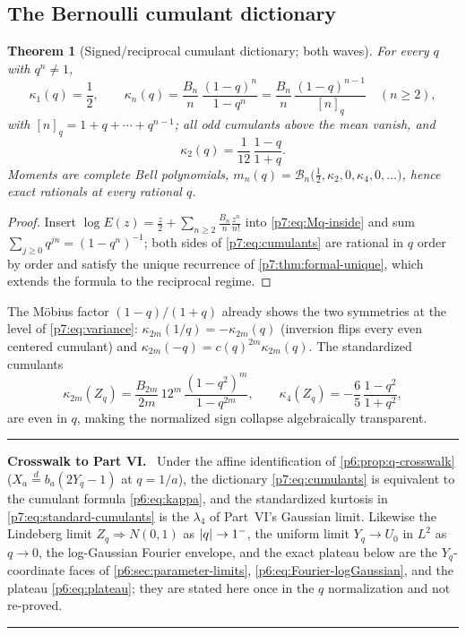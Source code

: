 \documentclass[11pt,oneside]{article}
\numberwithin{equation}{section}
\newtheorem{theorem}{Theorem}[section]
\theoremstyle{definition}
\theoremstyle{remark}
\newcommand{\Bell}{\mathcal B}
\newenvironment{statusbox}[1]{%
  \par\medskip\noindent\begin{center}\begin{minipage}{0.94\textwidth}%
  \color{linkblue}\hrule\vspace{0.65em}%
  \color{black}\textbf{\color{linkblue}#1.}\ }{%
  \par\vspace{0.65em}\color{linkblue}\hrule
  \end{minipage}\end{center}\medskip}
\begin{document}
\subsection{The Bernoulli cumulant dictionary}

\begin{theorem}[Signed/reciprocal cumulant dictionary; both waves]
\label{p7:thm:cumulants}
For every $q$ with $q^n\ne1$,
\begin{equation}\label{p7:eq:cumulants}
 \boxed{\ \kappa_1(q)=\frac12,
 \qquad
 \kappa_n(q)=\frac{B_n}{n}\,\frac{(1-q)^n}{1-q^n}
 =\frac{B_n}{n}\,\frac{(1-q)^{n-1}}{[n]_q}
 \quad(n\ge2),\ }
\end{equation}
with $[n]_q=1+q+\cdots+q^{n-1}$; all odd cumulants above the mean vanish, and
\begin{equation}\label{p7:eq:variance}
 \kappa_2(q)=\frac1{12}\,\frac{1-q}{1+q}.
\end{equation}
Moments are complete Bell polynomials,
$m_n(q)=\Bell_n\bigl(\tfrac12,\kappa_2,0,\kappa_4,0,\ldots\bigr)$, hence exact
rationals at every rational $q$.
\end{theorem}

\begin{proof}
Insert $\log E(z)=\tfrac z2+\sum_{n\ge2}\tfrac{B_n}{n}\tfrac{z^n}{n!}$ into
\eqref{p7:eq:Mq-inside} and sum $\sum_{j\ge0}q^{jn}=(1-q^n)^{-1}$; both sides
of \eqref{p7:eq:cumulants} are rational in $q$ order by order and satisfy the
unique recurrence of \cref{p7:thm:formal-unique}, which extends the formula to
the reciprocal regime.
\end{proof}

The M\"obius factor $(1-q)/(1+q)$ already shows the two symmetries at the
level of \eqref{p7:eq:variance}: $\kappa_{2m}(1/q)=-\kappa_{2m}(q)$ (inversion
flips every even centered cumulant) and
$\kappa_{2m}(-q)=c(q)^{2m}\kappa_{2m}(q)$.  The standardized cumulants
\begin{equation}\label{p7:eq:standard-cumulants}
 \kappa_{2m}(Z_q)=\frac{B_{2m}}{2m}\,12^m\,
 \frac{(1-q^2)^m}{1-q^{2m}},
 \qquad
 \kappa_4(Z_q)=-\frac65\,\frac{1-q^2}{1+q^2},
\end{equation}
are even in $q$, making the normalized sign collapse algebraically
transparent.

\begin{statusbox}{Crosswalk to Part VI}
Under the affine identification of \cref{p6:prop:q-crosswalk}
($X_a\overset d=b_a(2Y_q-1)$ at $q=1/a$), the dictionary
\eqref{p7:eq:cumulants} is equivalent to the cumulant formula
\eqref{p6:eq:kappa}, and the standardized kurtosis in
\eqref{p7:eq:standard-cumulants} is the $\lambda_4$ of Part~VI's Gaussian
limit.  Likewise the Lindeberg limit $Z_q\Rightarrow N(0,1)$ as
$\left\lvert q\right\rvert\to1^-$, the uniform limit $Y_q\to U_0$ in $L^2$ as $q\to0$, the
log-Gaussian Fourier envelope, and the exact plateau below are the
$Y_q$-coordinate faces of \cref{p6:sec:parameter-limits},
\cref{p6:eq:Fourier-logGaussian}, and the plateau
\eqref{p6:eq:plateau}; they are stated here once in the $q$ normalization and
not re-proved.
\end{statusbox}
\end{document}
